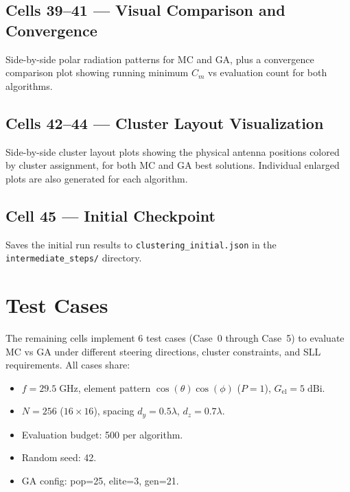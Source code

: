 \documentclass[11pt,a4paper]{article}
\begin{document}
\subsection{Cells 39--41 --- Visual Comparison and Convergence}

Side-by-side polar radiation patterns for MC and GA, plus a convergence comparison
plot showing running minimum $C_m$ vs evaluation count for both algorithms.

\subsection{Cells 42--44 --- Cluster Layout Visualization}

Side-by-side cluster layout plots showing the physical antenna positions colored
by cluster assignment, for both MC and GA best solutions.
Individual enlarged plots are also generated for each algorithm.

\subsection{Cell 45 --- Initial Checkpoint}

Saves the initial run results to \texttt{clustering\_initial.json} in the
\texttt{intermediate\_steps/} directory.

\newpage
\section{Test Cases}

The remaining cells implement 6 test cases (Case~0 through Case~5) to evaluate
MC vs GA under different steering directions, cluster constraints, and SLL requirements.
All cases share:
\begin{itemize}
    \item $f = 29.5\;\text{GHz}$, element pattern $\cos(\theta)\cos(\phi)$ ($P=1$),
          $G_{\text{el}} = 5\;\text{dBi}$.
    \item $N = 256$ ($16 \times 16$), spacing $d_y = 0.5\lambda$, $d_z = 0.7\lambda$.
    \item Evaluation budget: 500 per algorithm.
    \item Random seed: 42.
    \item GA config: pop=25, elite=3, gen=21.
\end{itemize}
\end{document}
